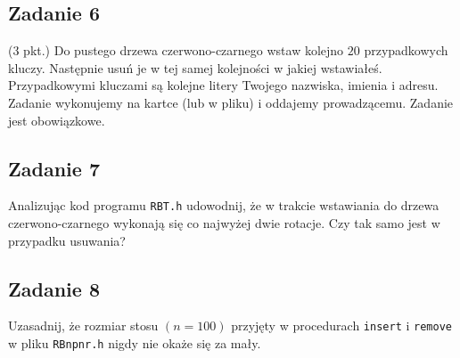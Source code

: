 \documentclass{article}
\begin{document}
\subsection*{Zadanie 6}
(3 pkt.) Do pustego drzewa czerwono-czarnego wstaw kolejno $20$ przypadkowych kluczy.
Następnie usuń je w tej samej kolejności w jakiej wstawiałeś. Przypadkowymi kluczami
są kolejne litery Twojego nazwiska, imienia i adresu. Zadanie wykonujemy na kartce
(lub w pliku) i oddajemy prowadzącemu. Zadanie jest obowiązkowe.

\subsection*{Zadanie 7}
Analizując kod programu \verb+RBT.h+ udowodnij, że w trakcie wstawiania do drzewa czerwono-czarnego
wykonają się co najwyżej dwie rotacje. Czy tak samo jest w przypadku usuwania?

\subsection*{Zadanie 8}
Uzasadnij, że rozmiar stosu $(n = 100)$ przyjęty w procedurach \verb+insert+ i \verb+remove+ w pliku
\verb+RBnpnr.h+ nigdy nie okaże się za mały.
\end{document}
